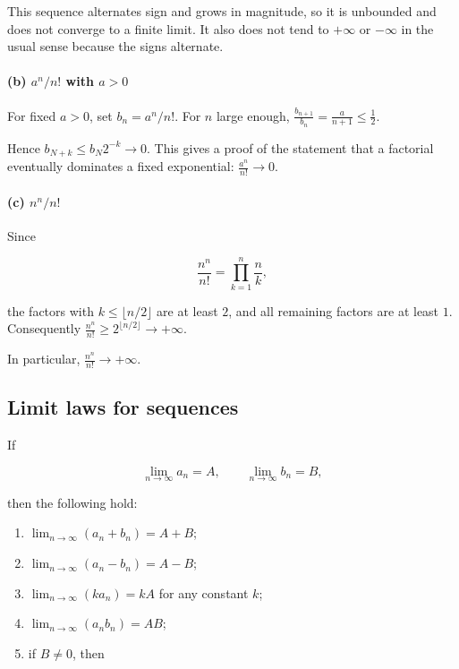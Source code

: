 \documentclass[11pt,a4paper]{article}
\begin{document}
This sequence alternates sign and grows in magnitude, so it is unbounded
and does not converge to a finite limit. It also does not tend to
\(+\infty\) or \(-\infty\) in the usual sense because the signs
alternate.

\paragraph{\texorpdfstring{(b) \(a^n/n!\) with
\(a>0\)}{(b) a\^{}n/n! with a\textgreater0}}\label{b-ann-with-a0}

For fixed \(a>0\), set \(b_n=a^n/n!\). For \(n\) large enough,
\(\frac{b_{n+1}}{b_n}=\frac{a}{n+1}\le\frac12.\)

Hence \(b_{N+k}\le b_N2^{-k}\to0\). This gives a proof of the statement
that a factorial eventually dominates a fixed exponential:
\(\frac{a^n}{n!}\to0.\)

\paragraph{\texorpdfstring{(c) \(n^n/n!\)}{(c) n\^{}n/n!}}\label{c-nnn}

Since

\[
\frac{n^n}{n!}=\prod_{k=1}^n\frac{n}{k},
\]

the factors with \(k\le\lfloor n/2\rfloor\) are at least \(2\), and all
remaining factors are at least \(1\). Consequently
\(\frac{n^n}{n!}\ge2^{\lfloor n/2\rfloor}\longrightarrow+\infty.\)

In particular, \(\frac{n^n}{n!}\to +\infty.\)

\subsection{Limit laws for sequences}\label{limit-laws-for-sequences}

If

\[
\lim_{n\to\infty}a_n=A,
\qquad
\lim_{n\to\infty}b_n=B,
\]

then the following hold:

\begin{enumerate}
\def\labelenumi{\arabic{enumi}.}
\item
  \(\displaystyle \lim_{n\to\infty}(a_n+b_n)=A+B\);
\item
  \(\displaystyle \lim_{n\to\infty}(a_n-b_n)=A-B\);
\item
  \(\displaystyle \lim_{n\to\infty}(k a_n)=kA\) for any constant \(k\);
\item
  \(\displaystyle \lim_{n\to\infty}(a_n b_n)=AB\);
\item
  if \(B\neq0\), then
\end{enumerate}
\end{document}
